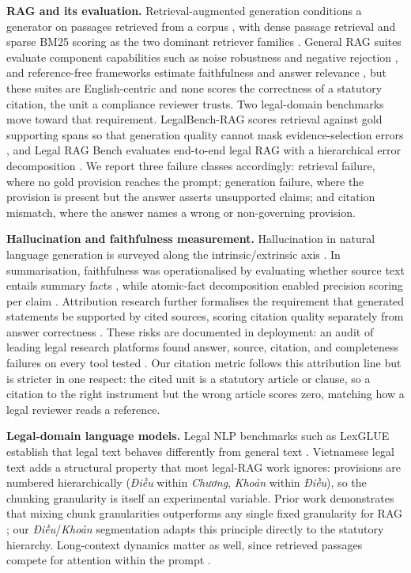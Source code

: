 \documentclass[conference,a4paper]{IEEEtran}
\begin{document}
\textbf{RAG and its evaluation.} Retrieval-augmented generation conditions a generator on passages retrieved from a corpus \cite{lewis2020rag}, with dense passage retrieval \cite{karpukhin2020dpr} and sparse BM25 scoring \cite{robertson2009bm25} as the two dominant retriever families \cite{gao2024ragsurvey}. General RAG suites evaluate component capabilities such as noise robustness and negative rejection \cite{liu2024rgb}, and reference-free frameworks estimate faithfulness and answer relevance \cite{es2024ragas}, but these suites are English-centric and none scores the correctness of a statutory citation, the unit a compliance reviewer trusts. Two legal-domain benchmarks move toward that requirement. LegalBench-RAG scores retrieval against gold supporting spans so that generation quality cannot mask evidence-selection errors \cite{pipitone2024legalbenchrag}, and Legal RAG Bench evaluates end-to-end legal RAG with a hierarchical error decomposition \cite{butler2026legalragbench}. We report three failure classes accordingly: retrieval failure, where no gold provision reaches the prompt; generation failure, where the provision is present but the answer asserts unsupported claims; and citation mismatch, where the answer names a wrong or non-governing provision.

\textbf{Hallucination and faithfulness measurement.} Hallucination in natural language generation is surveyed along the intrinsic/extrinsic axis \cite{ji2023hallucination}. In summarisation, faithfulness was operationalised by evaluating whether source text entails summary facts \cite{maynez2020faithfulness}, while atomic-fact decomposition enabled precision scoring per claim \cite{min2023factscore}. Attribution research further formalises the requirement that generated statements be supported by cited sources, scoring citation quality separately from answer correctness \cite{rashkin2023attribution}. These risks are documented in deployment: an audit of leading legal research platforms found answer, source, citation, and completeness failures on every tool tested \cite{magesh2025hallucinationfree}. Our citation metric follows this attribution line but is stricter in one respect: the cited unit is a statutory article or clause, so a citation to the right instrument but the wrong article scores zero, matching how a legal reviewer reads a reference.

\textbf{Legal-domain language models.} Legal NLP benchmarks such as LexGLUE establish that legal text behaves differently from general text \cite{chalkidis2022lexglue}. Vietnamese legal text adds a structural property that most legal-RAG work ignores: provisions are numbered hierarchically (\emph{Điều} within \emph{Chương}, \emph{Khoản} within \emph{Điều}), so the chunking granularity is itself an experimental variable. Prior work demonstrates that mixing chunk granularities outperforms any single fixed granularity for RAG \cite{qin2025mixgranularity}; our \emph{Điều}/\emph{Khoản} segmentation adapts this principle directly to the statutory hierarchy. Long-context dynamics matter as well, since retrieved passages compete for attention within the prompt \cite{liu2024lostmiddle}.
\end{document}

